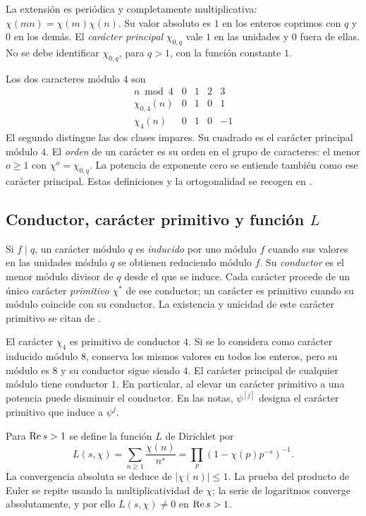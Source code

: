 La extensión es periódica y completamente multiplicativa:
$\chi(mn)=\chi(m)\chi(n)$. Su valor absoluto es $1$ en los enteros coprimos con
$q$ y $0$ en los demás. El \emph{carácter principal} $\chi_{0,q}$ vale
$1$ en las unidades y $0$ fuera de ellas. No se debe identificar
$\chi_{0,q}$, para $q>1$, con la función constante $1$.

Los dos caracteres módulo $4$ son
\[
\begin{array}{c|rrrr}
 n\bmod4&0&1&2&3\\ \hline
 \chi_{0,4}(n)&0&1&0&1\\
 \chi_4(n)&0&1&0&-1
\end{array}
\]
El segundo distingue las dos clases impares. Su cuadrado es el carácter
principal módulo $4$. El \emph{orden} de un carácter es su orden en el
grupo de caracteres: el menor $o\ge1$ con $\chi^o=\chi_{0,q}$.
La potencia de exponente cero se entiende también como ese carácter
principal. Estas definiciones y la ortogonalidad se recogen en
\cite[§27.8]{dlmf-dirichlet}.

\subsection{Conductor, carácter primitivo y función \texorpdfstring{$L$}{L}}

Si $f\mid q$, un carácter módulo $q$ es \emph{inducido} por uno módulo
$f$ cuando sus valores en las unidades módulo $q$ se obtienen reduciendo
módulo $f$. Su \emph{conductor} es el menor módulo divisor de $q$ desde
el que se induce. Cada carácter procede de un único carácter
\emph{primitivo} $\chi^*$ de ese conductor; un carácter es primitivo cuando
su módulo coincide con su conductor. La existencia y unicidad de este
carácter primitivo se citan de \cite[Teo.~18.13 y Def.~18.14]{sutherland-dirichlet}.

El carácter $\chi_4$ es primitivo de conductor $4$. Si se lo considera
como carácter inducido módulo $8$, conserva los mismos valores en todos
los enteros, pero su módulo es $8$ y su conductor sigue siendo $4$.
El carácter principal de cualquier módulo tiene conductor $1$.
En particular, al elevar un carácter primitivo a una potencia puede
disminuir el conductor. En las notas, $\psi^{[j]}$ designa el carácter
primitivo que induce a $\psi^j$.

Para $\operatorname{Re} s>1$ se define la función $L$ de Dirichlet por
\begin{equation}
 L(s,\chi)=\sum_{n\ge1}\frac{\chi(n)}{n^s}
          =\prod_p(1-\chi(p)p^{-s})^{-1}.
 \label{eq:intro-l}
\end{equation}
La convergencia absoluta se deduce de $|\chi(n)|\le1$. La prueba del
producto de Euler se repite usando la multiplicatividad de $\chi$;
la serie de logaritmos converge absolutamente, y por ello
$L(s,\chi)\ne0$ en $\operatorname{Re} s>1$.

